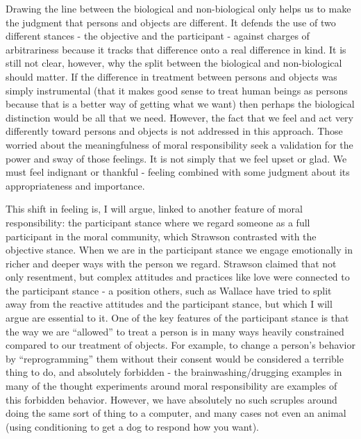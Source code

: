 \documentclass[phd,12pt,oneside,paper=letterpaper]{ubcthesis}
\begin{document}
Drawing the line between the biological and non-biological only helps us to make the judgment that persons and objects are different. It defends the use of two different stances - the objective and the participant - against charges of arbitrariness because it tracks that difference onto a real difference in kind. It is still not clear, however, why the split between the biological and non-biological should matter. If the difference in treatment between persons and objects was simply instrumental (that it makes good sense to treat human beings as persons because that is a better way of getting what we want) then perhaps the biological distinction would be all that we need. However, the fact that we feel and act very differently toward persons and objects is not addressed in this approach. Those worried about the meaningfulness of moral responsibility seek a validation for the power and sway of those feelings. It is not simply that we feel upset or glad. We must feel indignant or thankful - feeling combined with some judgment about its appropriateness and importance. 

This shift in feeling is, I will argue, linked to another feature of moral responsibility: the participant stance where we regard someone as a full participant in the moral community, which Strawson contrasted with the objective stance. When we are in the participant stance we engage emotionally in richer and deeper ways with the person we regard. Strawson claimed that not only resentment, but complex attitudes and practices like love were connected to the participant stance - a position others, such as Wallace \citep[p.30-2]{wallace1994} have tried to split away from the reactive attitudes and the participant stance, but which I will argue are essential to it. One of the key features of the participant stance is that the way we are ``allowed'' to treat a person is in many ways heavily constrained compared to our treatment of objects. For example, to change a person's behavior by ``reprogramming'' them without their consent would be considered a terrible thing to do, and absolutely forbidden - the brainwashing/drugging examples in many of the thought experiments around moral responsibility are examples of this forbidden behavior. However, we have absolutely no such scruples around doing the same sort of thing to a computer, and many cases not even an animal (using conditioning to get a dog to respond how you want). 
\end{document}

